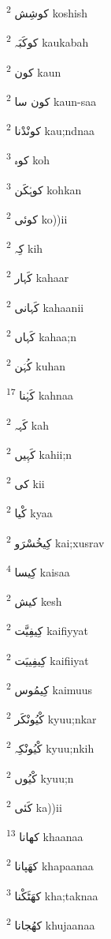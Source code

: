 \documentclass[12pt]{article}
\begin{document}
\begin{multicols}{5}
{\ur کوشِش}   \textsuperscript{2} koshish

{\ur کوکَبَہ}   \textsuperscript{2} kaukabah

{\ur کون}   \textsuperscript{2} kaun

{\ur کون سا}   \textsuperscript{2} kaun-saa

{\ur کونْدْنا}   \textsuperscript{2} kau;ndnaa

{\ur کوہ}   \textsuperscript{3} koh

{\ur کوہْکَن}   \textsuperscript{3} kohkan

{\ur کوئی}   \textsuperscript{2} ko))ii

{\ur کِہ}   \textsuperscript{2} kih

{\ur کَہار}   \textsuperscript{2} kahaar

{\ur کَہانی}   \textsuperscript{2} kahaanii

{\ur کَہاں}   \textsuperscript{2} kahaa;n

{\ur کُہَن}   \textsuperscript{2} kuhan

{\ur کَہْنا}   \textsuperscript{17} kahnaa

{\ur کَہہ}   \textsuperscript{2} kah

{\ur کَہِیں}   \textsuperscript{2} kahii;n

{\ur کی}   \textsuperscript{2} kii

{\ur کْیا}   \textsuperscript{2} kyaa

{\ur کِیخُسْرَو}   \textsuperscript{2} kai;xusrav

{\ur کِیسا}   \textsuperscript{4} kaisaa

{\ur کیش}   \textsuperscript{2} kesh

{\ur کِیفِیَّت}   \textsuperscript{2} kaifiyyat

{\ur کِیفِییَت}   \textsuperscript{2} kaifiiyat

{\ur کِیمُوس}   \textsuperscript{2} kaimuus

{\ur کْیُونْکَر}   \textsuperscript{2} kyuu;nkar

{\ur کْیُونْکِہ}   \textsuperscript{2} kyuu;nkih

{\ur کْیُوں}   \textsuperscript{2} kyuu;n

{\ur کَئی}   \textsuperscript{2} ka))ii

{\ur کھانا}   \textsuperscript{13} khaanaa

{\ur کھَپانا}   \textsuperscript{2} khapaanaa

{\ur کھَٹَکْنا}   \textsuperscript{3} kha;taknaa

{\ur کھُجانا}   \textsuperscript{2} khujaanaa


\end{multicols}
\end{document}
